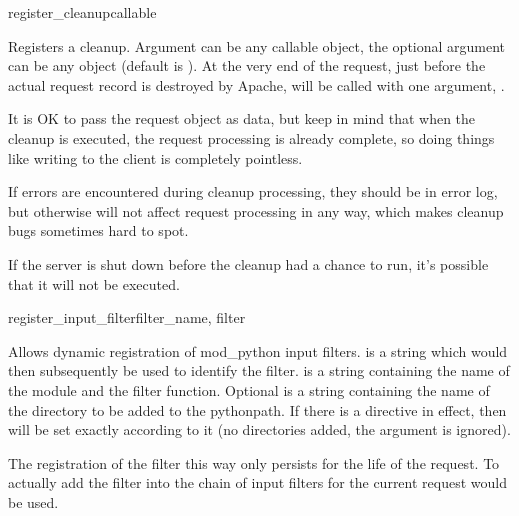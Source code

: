\begin{methoddesc}[request]{register_cleanup}{callable}

  Registers a cleanup. Argument  can be any callable
  object, the optional argument  can be any object (default is
  ). At the very end of the request, just before the actual
  request record is destroyed by Apache,  will be called
  with one argument, .

  It is OK to pass the request object as data, but keep in mind that
  when the cleanup is executed, the request processing is already
  complete, so doing things like writing to the client is completely
  pointless. 

  If errors are encountered during cleanup processing, they should be in
  error log, but otherwise will not affect request processing in any
  way, which makes cleanup bugs sometimes hard to spot.

  If the server is shut down before the cleanup had a chance to run,
  it's possible that it will not be executed.

\end{methoddesc}

\begin{methoddesc}[request]{register_input_filter}{filter_name, filter}

  Allows dynamic registration of mod_python input filters. 
  is a string which would then subsequently be used to identify the filter.
   is a string containing the name of the module and the filter
  function.  Optional  is a string containing the name of the
  directory to be added to the pythonpath. If there is a 
  directive in effect, then  will be set exactly according
  to it (no directories added, the  argument is ignored).

  The registration of the filter this way only persists for the life of the
  request. To actually add the filter into the chain of input filters for
  the current request  would be used.

\end{methoddesc}

